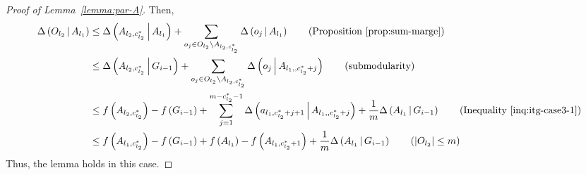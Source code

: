 \begin{proof}[Proof of Lemma~\ref{lemma:par-A}]
Then,
\begin{align*}
\marge{O_{l_2}}{A_{l_1}} &\le \marge{A_{l_2, c_{l_2}^*}}{A_{l_1}}  + \sum_{o_j \in O_{l_2}\setminus A_{l_2, c_{l_2}^*}}\marge{o_j}{A_{l_1}} \tag{Proposition~\ref{prop:sum-marge}}\\
&\le \marge{A_{l_2, c_{l_2}^*}}{G_{i-1}} + \sum_{o_j \in O_{l_2}\setminus A_{l_2, c_{l_2}^*}}\marge{o_j}{A_{l_1, , c_{l_2}^*+j}} \tag{submodularity}\\
&\le \ff{A_{l_2, c_{l_2}^*}}-\ff{G_{i-1}} + \sum_{j = 1}^{m-c_{l_2}^*-1}\marge{a_{l_1, c_{l_2}^*+j+1}}{A_{l_1, , c_{l_2}^*+j}} + \frac{1}{m} \marge{A_{l_1}}{G_{i-1}} \tag{Inequality~\eqref{inq:itg-case3-1}}\\
& \le \ff{A_{l_1, c_{l_2}^*}}-\ff{G_{i-1}} + \ff{A_{l_1}} - \ff{A_{l_1, c_{l_2}^*+1}}+ \frac{1}{m} \marge{A_{l_1}}{G_{i-1}} \tag{$|O_{l_2}|\le m$}
\end{align*}
Thus, the lemma holds in this case.
\end{proof}

